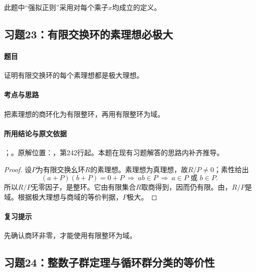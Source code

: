 此题中“强拟正则”采用对每个乘子$x$均成立的定义。



\subsection{习题23：有限交换环的素理想必极大}

\label{ex:3:23}

\paragraph{题目}

证明有限交换环的每个素理想都是极大理想。

\paragraph{考点与思路}

把素理想的商环化为有限整环，再用有限整环为域。

\paragraph{所用结论与原文依据}

；。原解位置：，第242行起。本题在现有习题解答的思路内补齐推导。


\begin{proof}

设$P$为有限交换幺环$R$的素理想。素理想为真理想，故$R/P\ne0$；素性给出
\[
(a+P)(b+P)=0+P\ \Longrightarrow\ ab\in P
\ \Longrightarrow\ a\in P\text{ 或 }b\in P.
\]
所以$R/P$无零因子，是整环。它由有限集合$R$取商得到，因而仍有限。由，$R/P$是域。根据极大理想与商域的等价判据，$P$极大。

\end{proof}

\paragraph{复习提示}

先确认商环非零，才能使用有限整环为域。



\subsection{习题24：整数子群定理与循环群分类的等价性}

